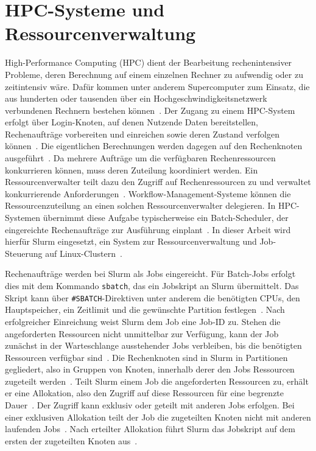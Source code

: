 \section{HPC-Systeme und Ressourcenverwaltung}
\label{sec:basics:hpc}
High-Performance Computing (HPC) dient der Bearbeitung
rechenintensiver Probleme, deren Berechnung auf einem einzelnen
Rechner zu aufwendig oder zu zeitintensiv wäre. Dafür kommen unter anderem Supercomputer zum Einsatz, die aus hunderten oder tausenden über ein
Hochgeschwindigkeitsnetzwerk verbundenen Rechnern bestehen
können~\cite{zdvhpc}. Der Zugang zu einem HPC-System erfolgt über
Login-Knoten, auf denen Nutzende Daten bereitstellen,
Rechenaufträge vorbereiten und einreichen sowie deren Zustand
verfolgen können~\cite{slurmdocs-admin}. Die eigentlichen
Berechnungen werden dagegen auf den Rechenknoten
ausgeführt~\cite{slurmdocs-admin}. Da mehrere Aufträge um die
verfügbaren Rechenressourcen konkurrieren können, muss deren
Zuteilung koordiniert werden. Ein Ressourcenverwalter teilt dazu
den Zugriff auf Rechenressourcen zu und verwaltet konkurrierende
Anforderungen~\cite{slurmdocs-quickstart}.
Workflow-Management-Systeme können die Ressourcenzuteilung an einen
solchen Ressourcenverwalter delegieren. In HPC-Systemen übernimmt
diese Aufgabe typischerweise ein Batch-Scheduler, der eingereichte Rechenaufträge zur Ausführung 
einplant~\cite[S.~5]{suter2026terminology}. In dieser Arbeit wird hierfür Slurm eingesetzt, ein System zur Ressourcenverwaltung und Job-Steuerung auf Linux-Clustern~\cite{slurmdocs-quickstart}.

Rechenaufträge werden bei Slurm als Jobs eingereicht. Für
Batch-Jobs erfolgt dies mit dem Kommando \texttt{sbatch}, das ein
Jobskript an Slurm übermittelt. Das Skript kann über
\texttt{\#SBATCH}-Direktiven unter anderem die benötigten CPUs, den
Hauptspeicher, ein Zeitlimit und die gewünschte Partition
festlegen~\cite{slurmdocs-sbatch}. Nach erfolgreicher Einreichung
weist Slurm dem Job eine Job-ID zu. Stehen die angeforderten
Ressourcen nicht unmittelbar zur Verfügung, kann der Job zunächst
in der Warteschlange ausstehender Jobs verbleiben, bis die
benötigten Ressourcen verfügbar
sind~\cite{slurmdocs-sbatch}. Die Rechenknoten sind in Slurm in
Partitionen gegliedert, also in Gruppen von Knoten, innerhalb derer
den Jobs Ressourcen zugeteilt
werden~\cite{slurmdocs-quickstart}. Teilt Slurm einem Job die
angeforderten Ressourcen zu, erhält er eine Allokation, also den
Zugriff auf diese Ressourcen für eine begrenzte
Dauer~\cite{slurmdocs-quickstart}. Der Zugriff kann exklusiv oder
geteilt mit anderen Jobs erfolgen. Bei einer exklusiven Allokation
teilt der Job die zugeteilten Knoten nicht mit anderen laufenden
Jobs~\cite{slurmdocs-sbatch}. Nach erteilter Allokation führt Slurm
das Jobskript auf dem ersten der zugeteilten Knoten
aus~\cite{slurmdocs-sbatch}.

